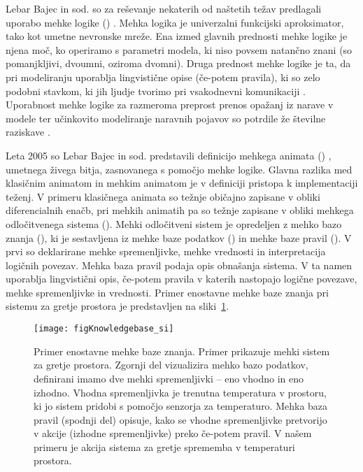 \begin{razsirjeniPovzetek}
Lebar Bajec in sod. \cite{lebarbajec2005fuzzy,lebarbajec2005simulating} so za reševanje nekaterih od naštetih težav predlagali uporabo mehke logike () \cite{zadeh1965fuzzy}. Mehka logika je univerzalni funkcijski aproksimator, tako kot umetne nevronske mreže. Ena izmed glavnih prednosti mehke logike je njena moč, ko operiramo s parametri modela, ki niso povsem natančno znani (so pomanjkljivi, dvoumni, oziroma dvomni). Druga prednost mehke logike je ta, da pri modeliranju uporablja lingvistične opise (če-potem pravila), ki so zelo podobni stavkom, ki jih ljudje tvorimo pri vsakodnevni komunikaciji \cite{kosko1994fuzzy,lebarbajec2005fuzzy,lebarbajec2005simulating,mamdani1975experiment,mendel2001uncertain,zadeh1965fuzzy}. Uporabnost mehke logike za razmeroma preprost prenos opažanj iz narave v modele ter učinkovito modeliranje naravnih pojavov so potrdile že številne raziskave \cite{dasilva2008predator,demsar2013family,demsar2014simulated,demsar2016balanced,demsar2017evolution,lebarbajec2005fuzzy,lebarbajec2005simulating,tron2004mathematical}.

Leta 2005 so Lebar Bajec in sod. predstavili definicijo mehkega animata () \cite{lebarbajec2005fuzzy,lebarbajec2005simulating}, umetnega živega bitja, zasnovanega s pomočjo mehke logike. Glavna razlika med klasičnim animatom in mehkim animatom je v definiciji pristopa k implementaciji teženj. V primeru klasičnega animata so težnje običajno zapisane v obliki diferencialnih enačb, pri mehkih animatih pa so težnje zapisane v obliki mehkega odločitvenega sistema (). Mehki odločitveni sistem je opredeljen z mehko bazo znanja (), ki je sestavljena iz mehke baze podatkov () in mehke baze pravil (). V prvi so deklarirane mehke spremenljivke, mehke vrednosti in interpretacija logičnih povezav. Mehka baza pravil podaja opis obnašanja sistema. V ta namen uporablja lingvistični opis, če-potem pravila v katerih nastopajo logične povezave, mehke spremenljivke in vrednosti. Primer enostavne mehke baze znanja pri sistemu za gretje prostora je predstavljen na sliki~\ref{fig:knowledgebase_si}.

\begin{figure}
	\texttt{[image: figKnowledgebase\_si]}
	\caption{Primer enostavne mehke baze znanja. Primer prikazuje mehki sistem za gretje prostora. Zgornji del vizualizira mehko bazo podatkov, definirani imamo dve mehki spremenljivki -- eno vhodno in eno izhodno. Vhodna spremenljivka je trenutna temperatura v prostoru, ki jo sistem pridobi s pomočjo senzorja za temperaturo. Mehka baza pravil (spodnji del) opisuje, kako se vhodne spremenljivke pretvorijo v akcije (izhodne spremenljivke) preko če-potem pravil. V našem primeru je akcija sistema za gretje sprememba v temperaturi prostora.}
	\label{fig:knowledgebase_si}
\end{figure}


\end{razsirjeniPovzetek}
